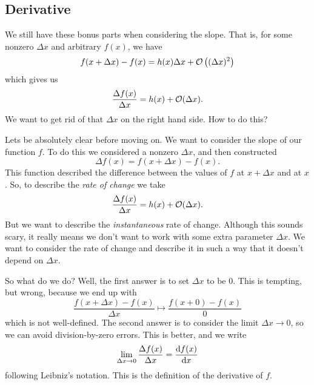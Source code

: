 
\subsection{Derivative}
\M
We still have these bonus parts when considering the slope. That
is, for some nonzero $\Delta x$ and arbitrary $f(x)$, we have 
\begin{equation}
f(x+\Delta x)-f(x)=h(x)\Delta x+\mathcal{O}\left((\Delta x)^{2}\right)
\end{equation}
which gives us
\begin{equation}
\frac{\Delta f(x)}{\Delta x}=h(x)+\mathcal{O}(\Delta x).
\end{equation}
We want to get rid of that $\Delta x$ on the right hand side. How
to do this?

Lets be absolutely clear before moving on. We want to consider
the slope of our function $f$. To do this we considered a nonzero
$\Delta x$, and then constructed
\begin{equation}
\Delta f(x)=f(x+\Delta x)-f(x).
\end{equation}
This function described the difference between the values of $f$
at $x+\Delta x$ and at $x$. So, to describe the \emph{rate of change}
we take
\begin{equation}
\frac{\Delta f(x)}{\Delta x}= h(x)+\mathcal{O}(\Delta x).
\end{equation}
But we want to describe the \emph{instantaneous} rate of
change. Although this sounds scary, it really means we don't want
to work with some extra parameter $\Delta x$. We want to consider
the rate of change and describe it in such a way that it doesn't
depend on $\Delta x$. 

So what do we do? Well, the first answer is to set $\Delta x$ to
be 0. This is tempting, but wrong, because we end up with
\begin{equation}
\frac{f(x+\Delta x)-f(x)}{\Delta x}\mapsto \frac{f(x+0)-f(x)}{0}
\end{equation}
which is not well-defined. The second answer is to consider the
limit $\Delta x\to 0$, so we can avoid division-by-zero
errors. This is better, and we write
\begin{equation}
\lim_{\Delta x\to 0}\frac{\Delta f(x)}{\Delta x}=\frac{\mathrm{d} f(x)}{\mathrm{d} x}
\end{equation}
following Leibniz's notation. This is the definition of the
derivative of $f$.

